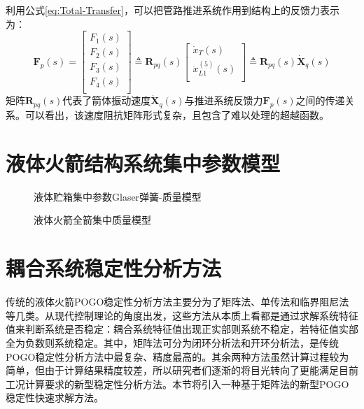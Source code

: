 利用公式\eqref{eq:Total-Transfer}，可以把管路推进系统作用到结构上的反馈力表示为：
\begin{equation}
  \label{eq:Feedback-Force-Transfer}
  \boldsymbol{F}_p(s)=\left[ \begin{matrix}
      F_1(s) \\
      F_2(s) \\
      F_3(s) \\
      F_4(s) \\
    \end{matrix} \right]  \triangleq \boldsymbol{R}_{pq}(s)\left[ \begin{matrix}
      \dot{x}_T(s)          \\
      \dot{x}_{L1}^{(5)}(s) \\
    \end{matrix} \right] \triangleq \boldsymbol{R}_{pq}(s)\boldsymbol{\dot{X}}_q(s)
\end{equation}
矩阵$\boldsymbol{R}_{pq}(s)$代表了箭体振动速度$\boldsymbol{\dot{X}}_q(s)$与推进系统反馈力$\boldsymbol{F}_p(s)$之间的传递关系。可以看出，该速度阻抗矩阵形式复杂，且包含了难以处理的超越函数。

\section{液体火箭结构系统集中参数模型}
\label{sec:Lumped-Rocket-Structural-System}
\begin{figure}[!htb]
  \centering
  \caption{液体贮箱集中参数Glaser弹簧-质量模型}\label{Lumped-Mass-Spring-Glaser}
\end{figure}

\begin{figure}[p]
  \centering
  \centerline{%
  }
  \caption{液体火箭全箭集中质量模型}\label{Whole-Rocket-Model}
\end{figure}

\section{耦合系统稳定性分析方法}
传统的液体火箭POGO稳定性分析方法主要分为了矩阵法、单传法和临界阻尼法\cite{Wang-Qizheng:1999}等几类。从现代控制理论的角度出发\cite{Ogata:2009}，这些方法从本质上看都是通过求解系统特征值来判断系统是否稳定：耦合系统特征值出现正实部则系统不稳定，若特征值实部全为负数则系统稳定。其中，矩阵法可分为闭环分析法和开环分析法，是传统POGO稳定性分析方法中最复杂、精度最高的。其余两种方法虽然计算过程较为简单，但由于计算结果精度较差，所以研究者们逐渐的将目光转向了更能满足目前工况计算要求的新型稳定性分析方法。本节将引入一种基于矩阵法的新型POGO稳定性快速求解方法。

